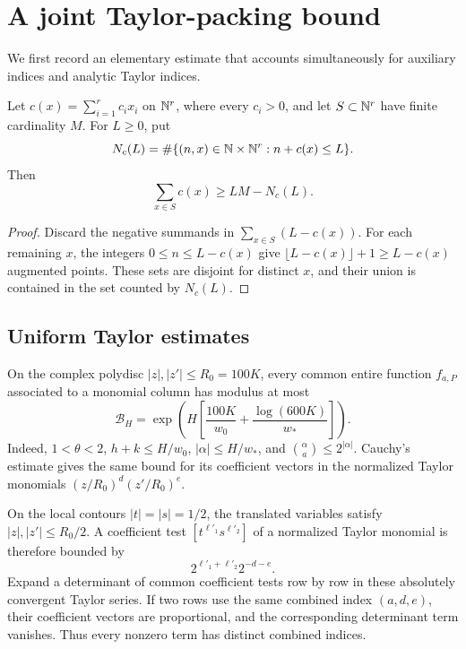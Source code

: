 \section{A joint Taylor-packing bound}\label{sec:direct-packing}

We first record an elementary estimate that accounts simultaneously
for auxiliary indices and analytic Taylor indices.

\begin{lemma}\label{lem:direct-packing}
Let \(c(x)=\sum_{i=1}^r c_i x_i\) on \(\mathbb N^r\), where every
\(c_i>0\), and let \(S\subset\mathbb N^r\) have finite cardinality \(M\).
For \(L\geq0\), put
\[
 N_c(L)=\#\{(n,x)\in\mathbb N\times\mathbb N^r:n+c(x)\leq L\}.
\]
Then
\[
                     \sum_{x\in S}c(x)\geq LM-N_c(L).
\]
\end{lemma}
\begin{proof}
Discard the negative summands in \(\sum_{x\in S}(L-c(x))\).
For each remaining \(x\), the integers \(0\leq n\leq L-c(x)\)
give \(\lfloor L-c(x)\rfloor+1\geq L-c(x)\) augmented points.
These sets are disjoint for distinct \(x\), and their union is
contained in the set counted by \(N_c(L)\).
\end{proof}

\subsection{Uniform Taylor estimates}

On the complex polydisc \(|z|,|z'|\leq R_0=100K\), every
common entire function \(f_{a,P}\) associated to a monomial column
has modulus at most
\[
 \mathcal B_H=
  \exp\left(H\left[\frac{100K}{w_0}
                           +\frac{\log(600K)}{w_*}\right]\right).
\]
Indeed, \(1<\theta<2\), \(h+k\leq H/w_0\),
\(|\alpha|\leq H/w_*\), and
\(\binom{\alpha}{a}\leq2^{|\alpha|}\).
Cauchy's estimate gives the same bound for its coefficient vectors
in the normalized Taylor monomials
\((z/R_0)^d(z'/R_0)^e\).

On the local contours \(|t|=|s|=1/2\), the translated variables
satisfy \(|z|,|z'|\leq R_0/2\). A coefficient test
\([t^{\ell'_1}s^{\ell'_2}]\) of a normalized Taylor monomial is
therefore bounded by
\[
                         2^{\ell'_1+\ell'_2}2^{-d-e}.
\]
Expand a determinant of common coefficient tests row by row in
these absolutely convergent Taylor series. If two rows use the
same combined index \((a,d,e)\), their coefficient vectors are
proportional, and the corresponding determinant term vanishes.
Thus every nonzero term has distinct combined indices.


